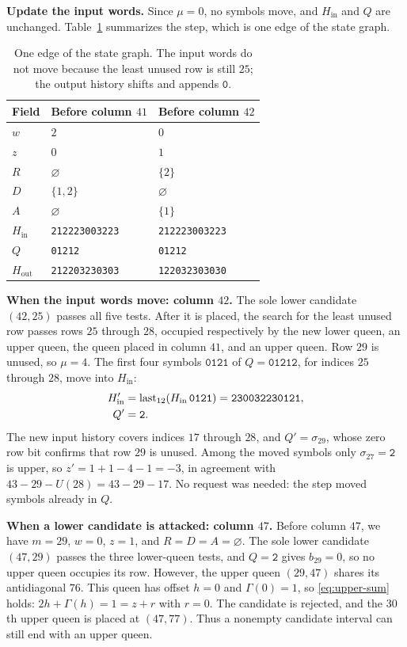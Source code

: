 \medskip\noindent
\textbf{Update the input words.}
Since $\mu=0$, no symbols move, and $H_{\mathrm{in}}$ and $Q$ are
unchanged. Table~\ref{tab:local-transition} summarizes the step,
which is one edge of the state graph.
\begin{table}[!htbp]
\centering
\begin{tabular}{lll}
\toprule
Field&Before column $41$&Before column $42$\\
\midrule
$w$&$2$&$0$\\
$z$&$0$&$1$\\
$R$&$\varnothing$&$\{2\}$\\
$D$&$\{1,2\}$&$\varnothing$\\
$A$&$\varnothing$&$\{1\}$\\
$H_{\mathrm{in}}$&\texttt{212223003223}&\texttt{212223003223}\\
$Q$&\texttt{01212}&\texttt{01212}\\
$H_{\mathrm{out}}$&\texttt{212203230303}&\texttt{122032303030}\\
\bottomrule
\end{tabular}
\caption{One edge of the state graph. The input words do not move
because the least unused row is still $25$; the output history
shifts and appends $\mathtt{0}$.}\label{tab:local-transition}
\end{table}

\medskip\noindent
\textbf{When the input words move: column $42$.}
The sole lower candidate $(42,25)$ passes all five tests. After it is
placed, the search for the least unused row passes rows $25$
through $28$, occupied respectively by the new lower queen, an upper
queen, the queen placed in column $41$, and an upper queen. Row $29$
is unused, so $\mu=4$. The first four symbols $\mathtt{0121}$ of
$Q=\mathtt{01212}$, for indices $25$ through $28$, move into
$H_{\mathrm{in}}$:
\[
 \begin{aligned}
 H'_{\mathrm{in}}&=\operatorname{last}_{12}(H_{\mathrm{in}}\,\mathtt{0121})
                  =\mathtt{230032230121},\\
 Q'&=\mathtt{2}.
 \end{aligned}
\]
The new input history covers indices $17$ through $28$, and
$Q'=\sigma_{29}$, whose zero row bit confirms that row $29$ is
unused. Among the moved symbols only $\sigma_{27}=\mathtt{2}$ is upper, so
$z'=1+1-4-1=-3$, in agreement with $43-29-U(28)=43-29-17$. No
request was needed: the step moved symbols already in $Q$.

\medskip\noindent
\textbf{When a lower candidate is attacked: column $47$.}
Before column $47$, we have $m=29$, $w=0$, $z=1$, and
$R=D=A=\varnothing$. The sole lower candidate $(47,29)$ passes the
three lower-queen tests, and $Q=\mathtt{2}$ gives $b_{29}=0$, so no
upper queen occupies its row. However, the upper queen $(29,47)$
shares its antidiagonal $76$. This queen has offset $h=0$ and
$\Gamma(0)=1$, so \eqref{eq:upper-sum} holds: $2h+\Gamma(h)=1=z+r$
with $r=0$. The candidate is rejected, and the $30$th upper queen is
placed at $(47,77)$. Thus a nonempty candidate interval can still
end with an upper queen.

